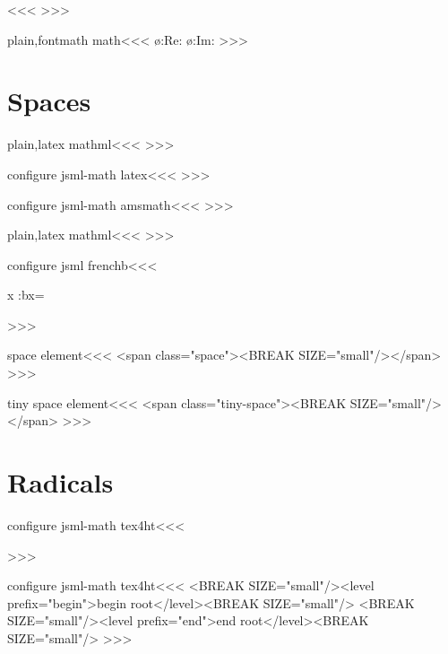 {\<\><<<
\HRestore\varinjlim
\HRestore\varprojlim
\HRestore\varlimsup
\HRestore\varliminf
>>>


\<plain,fontmath math\><<<
\def\:tempc{\o:Re:}
\HLet\Re\:tempc
\def\:tempc{\o:Im:}
\HLet\Im\:tempc
>>>

\section{Spaces}




\<plain,latex mathml\><<<
>>>


\<configure jsml-math latex\><<<
>>>


\<configure jsml-math amsmath\><<<
   {}
>>>

\<plain,latex mathml\><<<
\def\:nbsp{\leavevmode\special{t4ht@+\string&{35}x00A0{59}}x}
>>>



\<configure jsml frenchb\><<<
   {\leavevmode{}x%
    \setbox\tmp:bx=\hbox\bgroup}
   {\egroup}
>>>  

\<space element\><<<
<span class="space"><BREAK SIZE="small"/></span>%
>>>


\<tiny space element\><<<
<span class="tiny-space"><BREAK SIZE="small"/></span>%
>>>



\section{Radicals}



\<configure jsml-math tex4ht\><<<
  {%
  }
>>>

\<configure jsml-math tex4ht\><<<
   {<BREAK SIZE="small"/><level prefix="begin">begin
             root</level><BREAK SIZE="small"/>}
   {<BREAK SIZE="small"/><level prefix="end">end
             root</level><BREAK SIZE="small"/>}
>>>





}
